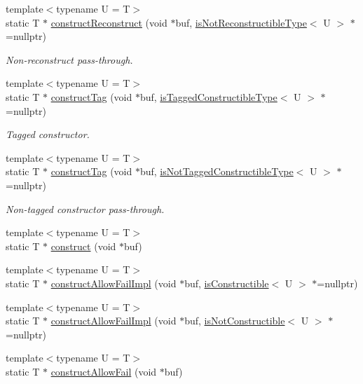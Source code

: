 \begin{DoxyCompactItemize}
\item 
{\footnotesize template$<$typename U  = T$>$ }\\static T $\ast$ \hyperlink{structcheckpoint_1_1dispatch_1_1_reconstructor_a8a504054312ef8e5703d938cc2ef75be}{construct\+Reconstruct} (void $\ast$buf, \hyperlink{namespacecheckpoint_a0054cbef71b90d6860e1d3916cf9d299}{is\+Not\+Reconstructible\+Type}$<$ U $>$ $\ast$=nullptr)
\begin{DoxyCompactList}\small\item\em Non-\/reconstruct pass-\/through. \end{DoxyCompactList}\item 
{\footnotesize template$<$typename U  = T$>$ }\\static T $\ast$ \hyperlink{structcheckpoint_1_1dispatch_1_1_reconstructor_ac702decacef9a6ef4d0cf5492187b9ab}{construct\+Tag} (void $\ast$buf, \hyperlink{namespacecheckpoint_abff0f367c546c94ce857d200153d990f}{is\+Tagged\+Constructible\+Type}$<$ U $>$ $\ast$=nullptr)
\begin{DoxyCompactList}\small\item\em Tagged constructor. \end{DoxyCompactList}\item 
{\footnotesize template$<$typename U  = T$>$ }\\static T $\ast$ \hyperlink{structcheckpoint_1_1dispatch_1_1_reconstructor_a116025ae56a26ed4d6a51b999f57fd47}{construct\+Tag} (void $\ast$buf, \hyperlink{namespacecheckpoint_a4eb64ee16bff7ef1609e5b98cb16cfb6}{is\+Not\+Tagged\+Constructible\+Type}$<$ U $>$ $\ast$=nullptr)
\begin{DoxyCompactList}\small\item\em Non-\/tagged constructor pass-\/through. \end{DoxyCompactList}\item 
{\footnotesize template$<$typename U  = T$>$ }\\static T $\ast$ \hyperlink{structcheckpoint_1_1dispatch_1_1_reconstructor_a31a927731c0b265003a416e8d20616a1}{construct} (void $\ast$buf)
\item 
{\footnotesize template$<$typename U  = T$>$ }\\static T $\ast$ \hyperlink{structcheckpoint_1_1dispatch_1_1_reconstructor_ac4eac94cd715ae6637f5f5c52bb78584}{construct\+Allow\+Fail\+Impl} (void $\ast$buf, \hyperlink{namespacecheckpoint_a48ec2649d5cbd890f67ea1193cc0d51a}{is\+Constructible}$<$ U $>$ $\ast$=nullptr)
\item 
{\footnotesize template$<$typename U  = T$>$ }\\static T $\ast$ \hyperlink{structcheckpoint_1_1dispatch_1_1_reconstructor_a13e4fc01aaa73ef810d519a405f16264}{construct\+Allow\+Fail\+Impl} (void $\ast$buf, \hyperlink{namespacecheckpoint_a14b3c81988a2c2d3c935edcc653b6322}{is\+Not\+Constructible}$<$ U $>$ $\ast$=nullptr)
\item 
{\footnotesize template$<$typename U  = T$>$ }\\static T $\ast$ \hyperlink{structcheckpoint_1_1dispatch_1_1_reconstructor_afbfa29526948dda3d9d843a377f526fc}{construct\+Allow\+Fail} (void $\ast$buf)
\end{DoxyCompactItemize}


